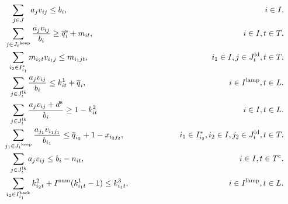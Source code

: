 \begin{center}
\begin{align}
&\hspace{2.6em} \sum_{j \in J} {\hspace{0.65em}a_{j}}{v_{ij}} \leq {b_{i}}, \hspace{24.7em} i \in I. \\
&\hspace{1.8em} \sum_{j \in {J_t}^{\rm{keep}}} \frac{a_{j} v_{ij}} {b_{i}} \geq \overline{q}_{i}^{\rm{s}} + {m_{it}}, \hspace{18.76em} i \in I, t \in T. \\
&\hspace{2.2em} \sum_{i_2 \in {I_{i_1}^*}} {m_{i_2t} v_{i_1j}} \leq {m_{i_1jt}}, \hspace{15.4em} i_1 \in I, j \in J_{t}^{\rm{ld}}, t \in T. \\
&\hspace{2.35em} \sum_{j \in J_{t}^{\rm{lk}}} \frac{a_{j} v_{ij}} {b_{i}} \leq k^1_{it} + \overline{q}_{i}, \hspace{17.85em} i \in I^{\rm{lamp}}, t \in L. \\
&\hspace{2.35em} \sum_{j \in J_{t}^{\rm{lk}}} \frac{a_{j} v_{ij} + d^{\rm{s}}} {b_{i}}  \geq 1 - k^2_{it}  \hspace{18.28em} i \in I, t \in L. \\
&\hspace{1.65em} \sum_{j_1\in {J_t}^{\rm{keep}}} \frac{a_{j_1} v_{i_1j_1}} {b_{i_1}} \leq \overline{q}_{i_2} + 1 - {x_{i_2j_2}}, \hspace{6.91em} i_1 \in {I_{i_2}^*}, i_2 \in I, j_2 \in J_{t}^{\rm{ld}}, t \in T. \\
&\hspace{2.35em} \sum_{j \in J_{t}^{\rm{lk}}} a_j v_{ij}  \leq b_{i} - n_{it}, \hspace{19.37em} i \in I, t \in T^{\rm{c}}. \\
&\hspace{1.83em} \sum_{i_2 \in I_{i_1}^{\rm{back}}} k^2_{i_2t} + I^{\rm{num}} (k^1_{i_1t} - 1) \leq  k^3_{i_1t}, \hspace{12.47em} i \in I^{\rm{lamp}}, t \in L.
\end{align}
\end{center}


